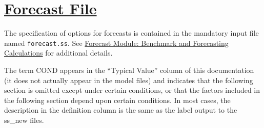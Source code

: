 \hypertarget{ForecastFile}{}
\section[Forecast File]{\protect\hyperlink{ForecastFile}{Forecast File}}
The specification of options for forecasts is contained in the mandatory input file named \texttt{forecast.ss}. See \hyperref[sec:forecast]{Forecast Module: Benchmark and Forecasting Calculations} for additional details. 

The term COND appears in the ``Typical Value'' column of this documentation (it does not actually appear in the model files) and indicates that the following section is omitted except under certain conditions, or that the factors included in the following section depend upon certain conditions. In most cases, the description in the definition column is the same as the label output to the ss\_new files.


